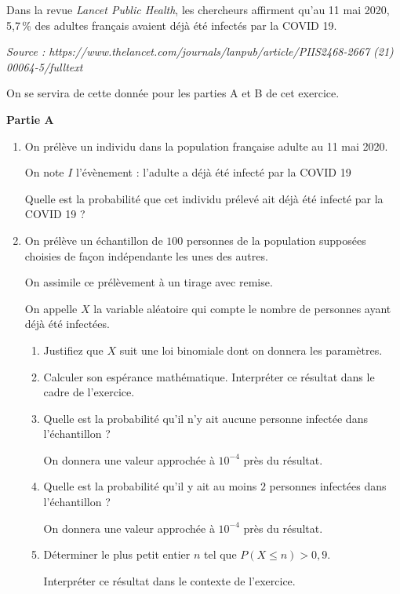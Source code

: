 \medskip

Dans la revue \emph{Lancet Public Health}, les chercheurs affirment qu'au 11 mai 2020, 5,7\,\% des adultes français avaient déjà été infectés par la COVID 19.

{\small \emph{Source : https://www.thelancet.com/journals/lanpub/article/PIIS2468-2667 (21) 00064-5/fulltext}}

On se servira de cette donnée pour les parties A et B de cet exercice.

\medskip

\textbf{Partie A}

\medskip

\begin{enumerate}
\item On prélève un individu dans la population française adulte au 11 mai 2020.

On note $I$ l'évènement : \og l'adulte a déjà été infecté par la COVID 19 \fg

Quelle est la probabilité que cet individu prélevé ait déjà été infecté par la COVID 19 ?
\item On prélève un échantillon de $100$ personnes de la population supposées choisies de façon indépendante les unes des autres.

On assimile ce prélèvement à un tirage avec remise.

On appelle $X$ la variable aléatoire qui compte le nombre de personnes ayant déjà été infectées.
	\begin{enumerate}
		\item Justifiez que $X$ suit une loi binomiale dont on donnera les paramètres.
		\item Calculer son espérance mathématique. Interpréter ce résultat dans le cadre de
l'exercice.
		\item Quelle est la probabilité qu'il n'y ait aucune personne infectée dans l'échantillon ?

On donnera une valeur approchée à $10^{-4}$ près du résultat.
		\item Quelle est la probabilité qu'il y ait au moins $2$ personnes infectées dans l'échantillon ?

On donnera une valeur approchée à $10^{-4}$ près du résultat.
		\item Déterminer le plus petit entier $n$ tel que $P(X \leqslant n) > 0,9$.

Interpréter ce résultat dans le contexte de l'exercice.
	\end{enumerate}
\end{enumerate}

